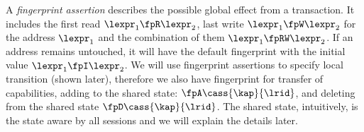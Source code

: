 A \emph{fingerprint assertion} describes the possible global effect from a transaction.
It includes the first read \( \lexpr_{1} \fpR \lexpr_{2} \), last write \( \lexpr_{1} \fpW \lexpr_{2} \) for the address \( \lexpr_{1} \) and the combination of them \( \lexpr_{1} \fpRW \lexpr_{2} \).
If an address remains untouched, it will have the default fingerprint with the initial value \( \lexpr_{1} \fpI \lexpr_{2} \).
We will use fingerprint assertions to specify local transition (shown later), therefore we also have fingerprint for transfer of capabilities, \ie adding to the shared state: \( \fpA \cass{\kap}{\lrid} \), and deleting from the shared state \( \fpD \cass{\kap}{\lrid} \).
The shared state, intuitively, is the state aware by all sessions and we will explain the details later.


